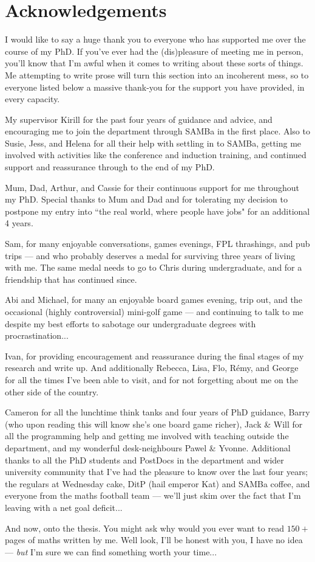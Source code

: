 \chapter*{Acknowledgements}
I would like to say a huge thank you to everyone who has supported me over the course of my PhD.
If you've ever had the (dis)pleasure of meeting me in person, you'll know that I'm awful when it comes to writing about these sorts of things.
Me attempting to write prose will turn this section into an incoherent mess, so to everyone listed below a massive thank-you for the support you have provided, in every capacity.

My supervisor Kirill for the past four years of guidance and advice, and encouraging me to join the department through SAMBa in the first place.
Also to Susie, Jess, and Helena for all their help with settling in to SAMBa, getting me involved with activities like the conference and induction training, and continued support and reassurance through to the end of my PhD.

Mum, Dad, Arthur, and Cassie for their continuous support for me throughout my PhD.
Special thanks to Mum and Dad and for tolerating my decision to postpone my entry into ``the real world, where people have jobs" for an additional 4 years.

Sam, for many enjoyable conversations, games evenings, FPL thrashings, and pub trips --- and who probably deserves a medal for surviving three years of living with me. 
The same medal needs to go to Chris during undergraduate, and for a friendship that has continued since.

Abi and Michael, for many an enjoyable board games evening, trip out, and the occasional (highly controversial) mini-golf game --- and continuing to talk to me despite my best efforts to sabotage our undergraduate degrees with procrastination...

Ivan, for providing encouragement and reassurance during the final stages of my research and write up. 
And additionally Rebecca, Lisa, Flo, R\'{e}my, and George for all the times I've been able to visit, and for not forgetting about me on the other side of the country.

Cameron for all the lunchtime think tanks and four years of PhD guidance, Barry (who upon reading this will know she's one board game richer), Jack \& Will for all the programming help and getting me involved with teaching outside the department, and my wonderful desk-neighbours Pawel \& Yvonne.
Additional thanks to all the PhD students and PostDocs in the department and wider university community that I've had the pleasure to know over the last four years; the regulars at Wednesday cake, DitP (hail emperor Kat) and SAMBa coffee, and everyone from the maths football team --- we'll just skim over the fact that I'm leaving with a net goal deficit... 

And now, onto the thesis.
You might ask why would you ever want to read $150+$ pages of maths written by me.
Well look, I'll be honest with you, I have no idea --- \emph{but} I'm sure we can find something worth your time...